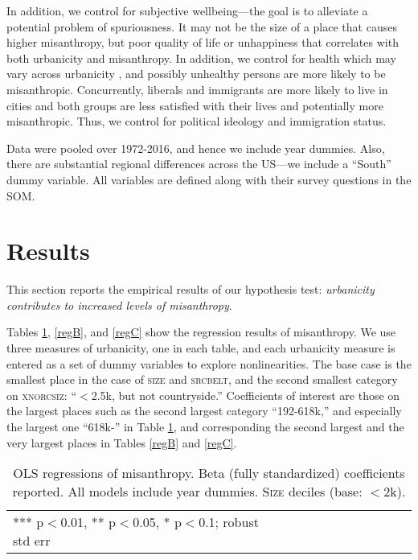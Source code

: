 \documentclass[11pt, letterpaper]{article}
\begin{document}
\begin{spacing}{1.4}
In addition, we control for subjective wellbeing---the goal is to alleviate a potential problem of spuriousness. It may not be the size of a place that causes higher misanthropy, but %
poor quality of life or unhappiness \citep{aok21} that correlates with
both urbanicity and misanthropy.  %
 In addition, we control for health which may vary across urbanicity
 \citep[e.g.,][]{chen2019differences}, and possibly unhealthy persons are more likely to be misanthropic.  
 Concurrently, liberals and immigrants are more likely to live in cities and both groups are less satisfied with their lives \citep{aok11a,aokJap14} and potentially more misanthropic. Thus, we control for political ideology and immigration status.

Data were pooled over 1972-2016, and hence we include year dummies. Also, there
are substantial regional differences across the US---we include a ``South'' dummy variable. All variables are defined along with their survey questions in the SOM.

\section*{Results}

This section reports the empirical results of our hypothesis test:
 \textit{urbanicity contributes to increased levels of misanthropy}.

Tables \ref{regA}, \ref{regB}, and \ref{regC} show the regression results of misanthropy. We use three measures of
urbanicity, one in each table,  and each urbanicity measure is entered as a set of dummy variables to
explore nonlinearities. The base case is the smallest place in the case of
\textsc{size} and \textsc{srcbelt}, and the second smallest category on \textsc{xnorcsiz}:
 ``$<$2.5k, but not countryside.'' Coefficients of interest are those on the
 largest  places such as the second largest category ``192-618k,'' and especially the largest one ``618k-'' in Table
\ref{regA}, and corresponding the second largest and the very largest places in Tables
\ref{regB} and \ref{regC}.

\begin{table}[h!]\centering
\caption{OLS regressions  of misanthropy. Beta (fully standardized) coefficients
  reported. All models include year dummies. \textsc{Size} deciles (base: $<$2k).} \label{regA}
\begin{scriptsize} \begin{tabular}{p{1.8in}p{.45in}p{.45in}p{.45in}p{.45in}p{.45in}p{.45in}p{.45in}p{.45in}p{.45in}p{.45 in}}\hline

\hline  *** p$<$0.01, ** p$<$0.05, * p$<$0.1; robust std err
\end{tabular}\end{scriptsize}\end{table}


\end{spacing}
\end{document}
